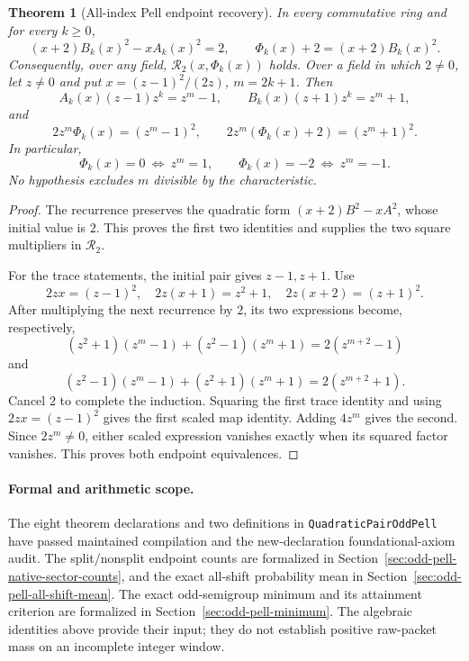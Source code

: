 \documentclass[11pt]{article}
\newtheorem{theorem}{Theorem}[section]
\begin{document}
\begin{theorem}[All-index Pell endpoint recovery]
\label{thm:odd-pell-algebraic-endpoints}
In every commutative ring and for every \(k\ge0\),
\[
 (x+2)B_k(x)^2-xA_k(x)^2=2,\qquad
 \Phi_k(x)+2=(x+2)B_k(x)^2.
\]
Consequently, over any field, \(\mathcal R_2(x,\Phi_k(x))\) holds.
Over a field in which \(2\ne0\), let \(z\ne0\) and put
\(x=(z-1)^2/(2z)\), \(m=2k+1\). Then
\[
 A_k(x)(z-1)z^k=z^m-1,\qquad
 B_k(x)(z+1)z^k=z^m+1,
\]
and
\[
 2z^m\Phi_k(x)=(z^m-1)^2,\qquad
 2z^m(\Phi_k(x)+2)=(z^m+1)^2.
\]
In particular,
\[
 \Phi_k(x)=0\ \Longleftrightarrow\ z^m=1,\qquad
 \Phi_k(x)=-2\ \Longleftrightarrow\ z^m=-1.
\]
No hypothesis excludes \(m\) divisible by the characteristic.
\end{theorem}
\begin{proof}
The recurrence preserves the quadratic form
\((x+2)B^2-xA^2\), whose initial value is \(2\).
This proves the first two identities and supplies the two square
multipliers in \(\mathcal R_2\).

For the trace statements, the initial pair gives \(z-1,z+1\).
Use
\[
 2zx=(z-1)^2,\quad
 2z(x+1)=z^2+1,\quad
 2z(x+2)=(z+1)^2.
\]
After multiplying the next recurrence by \(2\), its two expressions
become, respectively,
\[
 (z^2+1)(z^m-1)+(z^2-1)(z^m+1)=2(z^{m+2}-1)
\]
and
\[
 (z^2-1)(z^m-1)+(z^2+1)(z^m+1)=2(z^{m+2}+1).
\]
Cancel \(2\) to complete the induction.
Squaring the first trace identity and using \(2zx=(z-1)^2\)
gives the first scaled map identity. Adding \(4z^m\) gives the second.
Since \(2z^m\ne0\), either scaled expression vanishes exactly when
its squared factor vanishes. This proves both endpoint equivalences.
\end{proof}

\paragraph{Formal and arithmetic scope.}
The eight theorem declarations and two definitions in
\texttt{QuadraticPairOddPell} have passed maintained compilation and
the new-declaration foundational-axiom audit.
The split/nonsplit endpoint counts are formalized in
Section~\ref{sec:odd-pell-native-sector-counts}, and the exact
all-shift probability mean in Section~\ref{sec:odd-pell-all-shift-mean}.
The exact odd-semigroup minimum and its attainment criterion are
formalized in Section~\ref{sec:odd-pell-minimum}.
The algebraic identities above provide their input; they do not
establish positive raw-packet mass on an incomplete integer window.
\end{document}
